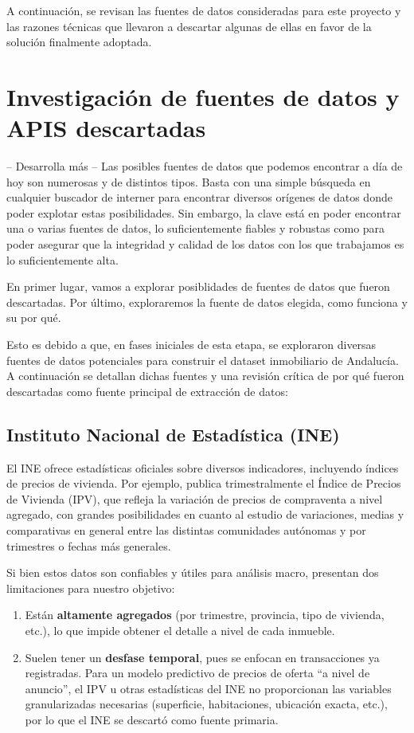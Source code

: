 \documentclass[a4paper,11pt]{book}
\begin{document}
A continuación, se revisan las fuentes de datos consideradas para este proyecto y las razones técnicas que llevaron a descartar algunas de ellas en favor de la solución finalmente adoptada.



\section{Investigación de fuentes de datos y APIS descartadas}
-- Desarrolla más --
Las posibles fuentes de datos que podemos encontrar a día de hoy son numerosas y de distintos tipos. Basta con una simple búsqueda en cualquier buscador de interner para encontrar diversos orígenes de datos donde poder explotar estas posibilidades. Sin embargo, la clave está en poder encontrar una o varias fuentes de datos, lo suficientemente fiables y robustas como para poder asegurar que la integridad y calidad de los datos con los que trabajamos es lo suficientemente alta.

En primer lugar, vamos a explorar posiblidades de fuentes de datos que fueron descartadas. Por último, exploraremos la fuente de datos elegida, como funciona y su por qué.

Esto es debido a que, en fases iniciales de esta etapa, se exploraron diversas fuentes de datos  potenciales para construir el dataset inmobiliario de Andalucía. A continuación se detallan dichas fuentes y una revisión crítica de por qué fueron descartadas como fuente principal de extracción de datos:

\subsection{Instituto Nacional de Estadística (INE)}

El INE ofrece estadísticas oficiales sobre diversos indicadores, incluyendo índices de precios de vivienda. Por ejemplo, publica trimestralmente el Índice de Precios de Vivienda (IPV), que refleja la variación de precios de compraventa a nivel agregado, con grandes posibilidades en cuanto al estudio de variaciones, medias y comparativas en general entre las distintas comunidades autónomas y por trimestres o fechas más generales. 

Si bien estos datos son confiables y útiles para análisis macro, presentan dos limitaciones para nuestro objetivo:
\begin{enumerate}
    \item Están \textbf{altamente agregados} (por trimestre, provincia, tipo de vivienda, etc.), lo que impide obtener el detalle a nivel de cada inmueble.
    \item Suelen tener un \textbf{desfase temporal}, pues se enfocan en transacciones ya registradas. Para un modelo predictivo de precios de oferta “a nivel de anuncio”, el IPV u otras estadísticas del INE no proporcionan las variables granularizadas necesarias (superficie, habitaciones, ubicación exacta, etc.), por lo que el INE se descartó como fuente primaria.
\end{enumerate}
\end{document}
